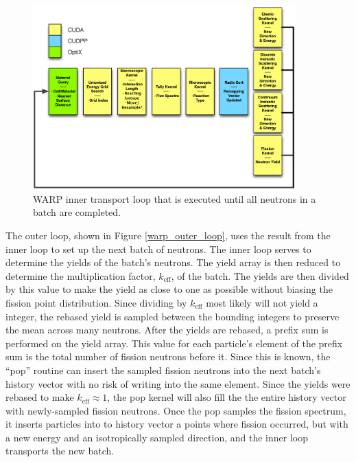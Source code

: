 \begin{figure}[h!] 
\centering
\includegraphics[width=0.9\textwidth]{graphics/warp_inner_loop.eps}
\caption{WARP inner transport loop that is executed until all neutrons in a batch are completed. \label{warp_inner_loop} }
\end{figure}

The outer loop, shown in Figure \ref{warp_outer_loop}, uses the result from the inner loop to set up the next batch of neutrons.  The inner loop serves to determine the yields of the batch's neutrons.  The yield array is then reduced to determine the multiplication factor, $k_\mathrm{eff}$, of the batch.  The yields are then divided by this value to make the yield as close to one as possible without biasing the fission point distribution.  Since dividing by $k_\mathrm{eff}$ most likely will not yield a integer, the rebased yield is sampled between the bounding integers to preserve the mean across many neutrons.  After the yields are rebased, a prefix sum is performed on the yield array.  This value for each particle's element of the prefix sum is the total number of fission neutrons before it.  Since this is known, the ``pop'' routine can insert the sampled fission neutrons into the next batch's history vector with no risk of writing into the same element.  Since the yields were rebased to make $k_\mathrm{eff}\approx1$, the pop kernel will also fill the the entire history vector with newly-sampled fission neutrons.  Once the pop samples the fission spectrum, it inserts particles into to history vector a points where fission occurred, but with a new energy and an isotropically sampled direction, and the inner loop transports the new batch.

